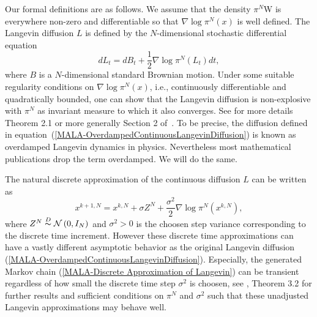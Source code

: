 Our formal definitions are as follows. We assume that the density $ \pi ^{N} $W is everywhere non-zero and differentiable so that $ \nabla \log \pi^{N}(x) $ is well defined. The  Langevin diffusion $L$  is defined by the $N$-dimensional stochastic differential equation
\begin{equation}
 \label{MALA-OverdampedContinuousLangevinDiffusion}
 dL_t = dB_t + \frac{1}{2} \nabla \log \pi^{N}(L_t)dt,
\end{equation}
where $B$ is a $N$-dimensional standard Brownian motion. Under some suitable regularity conditions on $ \nabla \log \pi^{N}(x) $, i.e., continuously differentiable and quadratically bounded, one can show that the Langevin diffusion is non-explosive with $ \pi^{N} $ as invariant measure to which it also converges. See for more details Theorem 2.1 or more generally Section 2 of~\autocite{TweedieRoberts1996}. To be precise, the diffusion defined in equation~(\ref{MALA-OverdampedContinuousLangevinDiffusion}) is known as overdamped Langevin dynamics in physics. Nevertheless most mathematical publications drop the term overdamped. We will do the same.


The natural discrete approximation of the continuous diffusion $L$ can be written as
\begin{equation}
 \label{MALA-Discrete Approximation of Langevin}
 x^{k+1,N} = x^{k,N} + \sigma Z^N + \frac{\sigma^2}{2} \nabla \log \pi^{N} \left( x^{k,N} \right),  
\end{equation}
where $ Z^N \stackrel{D}{\thicksim} \mathcal{N}\left( 0, I_N \right) $ and $\sigma^2 > 0 $ is the choosen step variance corresponding to the discrete time increment. However these discrete time approximations can have a vastly different asymptotic behavior as the original Langevin diffusion (\ref{MALA-OverdampedContinuousLangevinDiffusion}). Especially, the generated Markov chain (\ref{MALA-Discrete Approximation of Langevin}) can be transient regardless of how small the discrete time step $ \sigma^2 $ is choosen, see \autocite{TweedieRoberts1996}, Theorem 3.2 for further results and sufficient conditions on $ \pi^{N} $ and $ \sigma^2 $ such that these unadjusted Langevin approximations may behave well.

